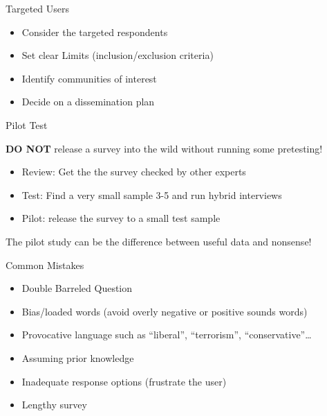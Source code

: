 \begin{frame}{Targeted Users}

\begin{itemize}
\tightlist
\item
  Consider the targeted respondents
\item
  Set clear Limits (inclusion/exclusion criteria)
\item
  Identify communities of interest
\item
  Decide on a dissemination plan
\end{itemize}

\end{frame}

\begin{frame}{Pilot Test}

\textbf{DO NOT} release a survey into the wild without running some
pretesting!

\begin{itemize}
\tightlist
\item
  Review: Get the the survey checked by other experts
\item
  Test: Find a very small sample 3-5 and run hybrid interviews
\item
  Pilot: release the survey to a small test sample
\end{itemize}

The pilot study can be the difference between useful data and nonsense!

\end{frame}

\begin{frame}{ Common Mistakes}

\begin{itemize}
\tightlist
\item
  Double Barreled Question
\item
  Bias/loaded words (avoid overly negative or positive sounds words)
\item
  Provocative language such as ``liberal'', ``terrorism'',
  ``conservative''\ldots{}
\item
  Assuming prior knowledge
\item
  Inadequate response options (frustrate the user)
\item
  Lengthy survey
\end{itemize}

\end{frame}

